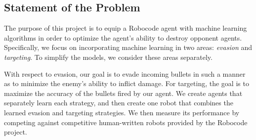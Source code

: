 \documentclass{article}
\newcommand{\xxx}[1]{\textcolor{red}{#1}}
\theoremstyle{plain}
\theoremstyle{definition}
\theoremstyle{remark}
\begin{document}
\subsection*{Statement of the Problem}

The purpose of this project is to equip a Robocode agent with machine learning algorithms in order to optimize the agent's ability to destroy opponent agents. Specifically, we focus on incorporating machine learning in two areas: \emph{evasion} and \emph{targeting}. To simplify the models, we consider these areas separately.

With respect to evasion, our goal is to evade incoming bullets in such a manner as to minimize the enemy's ability to inflict damage. For targeting, the goal is to maximize the accuracy of the bullets fired by our agent. We create agents that separately learn each strategy, and then create one robot that combines the learned evasion and targeting strategies. We then measure its performance by competing against competitive human-written robots provided by the Robocode project. 


\end{document}
